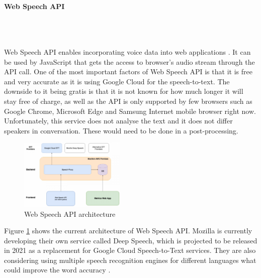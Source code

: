 \documentclass{article}
\newcommand{\subsubsubsection}[1]{\paragraph{#1}\mbox{}\\}
\begin{document}
\subsubsubsection{Web Speech API}
\\
{\large
Web Speech API enables incorporating voice data into web applications \parencite{webspeechapidocs}. It can be used by JavaScript that gets the access to browser's audio stream through the API call. One of the most important factors of Web Speech API is that it is free and very accurate as it is using Google Cloud for the speech-to-text. The downside to it being gratis is that it is not known for how much longer it will stay free of charge, as well as the API is only supported by few browsers such as Google Chrome, Microsoft Edge and Samsung Internet mobile browser right now. Unfortunately, this service does not analyse the text and it does not differ speakers in conversation. These would need to be done in a post-processing.\par

\begin{figure}
  \vspace{-20pt}
  \begin{center}
    \includegraphics[width=0.45\textwidth]{img/webspeecharchitecture.png}
  \end{center}
  \vspace{-20pt}
  \caption{Web Speech API architecture}
  \label{fig:webspeecharchitecture}
  \vspace{-10pt}
\end{figure}
Figure \ref{fig:webspeecharchitecture} shows the current architecture of Web Speech API. Mozilla is currently developing their own service called Deep Speech, which is projected to be released in 2021 as a replacement for Google Cloud Speech-to-Text services. They are also considering using multiple speech recognition engines for different languages what could improve the word accuracy \parencite{webspeechapidocs2}.\par
}
\end{document}
